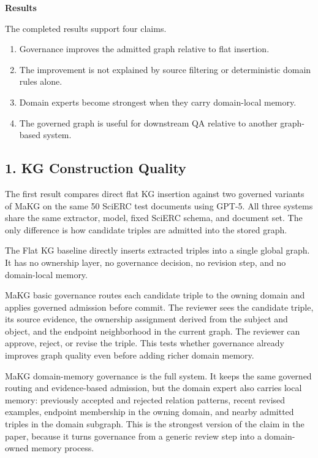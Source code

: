 \textbf{Results}

The completed results support four claims.

\begin{enumerate}
\def\labelenumi{\arabic{enumi}.}
\item
  Governance improves the admitted graph relative to flat insertion.
\item
  The improvement is not explained by source filtering or deterministic
  domain rules alone.
\item
  Domain experts become strongest when they carry domain-local memory.
\item
  The governed graph is useful for downstream QA relative to another
  graph-based system.
\end{enumerate}

\subsection{1. KG Construction Quality}\label{kg-construction-quality}

The first result compares direct flat KG insertion against two governed
variants of MaKG on the same 50 SciERC test documents using GPT-5. All
three systems share the same extractor, model, fixed SciERC schema, and
document set. The only difference is how candidate triples are admitted
into the stored graph.

The Flat KG baseline directly inserts extracted triples into a single
global graph. It has no ownership layer, no governance decision, no
revision step, and no domain-local memory.

MaKG basic governance routes each candidate triple to the owning domain
and applies governed admission before commit. The reviewer sees the
candidate triple, its source evidence, the ownership assignment derived
from the subject and object, and the endpoint neighborhood in the
current graph. The reviewer can approve, reject, or revise the triple.
This tests whether governance already improves graph quality even before
adding richer domain memory.

MaKG domain-memory governance is the full system. It keeps the same
governed routing and evidence-based admission, but the domain expert
also carries local memory: previously accepted and rejected relation
patterns, recent revised examples, endpoint membership in the owning
domain, and nearby admitted triples in the domain subgraph. This is the
strongest version of the claim in the paper, because it turns governance
from a generic review step into a domain-owned memory process.

